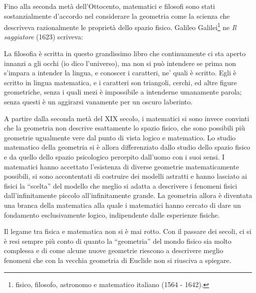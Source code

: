 Fino alla seconda metà dell'Ottocento, matematici e filosofi sono stati sostanzialmente d'accordo nel considerare la geometria come la scienza che descriveva razionalmente le proprietà dello spazio fisico. Galileo Galilei\footnote{fisico, filosofo, astronomo e matematico italiano (1564 - 1642).} ne \emph{Il saggiatore} (1623) scriveva:
\begin{quoting}
La filosofia è scritta in questo grandissimo libro che continuamente ci sta aperto innanzi a gli occhi (io dico l'universo), ma non si può intendere se prima non s'impara a intender la lingua, e conoscer i caratteri, ne' quali è scritto. Egli è scritto in lingua matematica, e i caratteri son triangoli, cerchi, ed altre figure geometriche, senza i quali mezi è impossibile a intenderne umanamente parola; senza questi è un aggirarsi vanamente per un oscuro laberinto.
\end{quoting}
A partire dalla seconda metà del XIX secolo, i matematici si sono invece convinti che la geometria non descrive esattamente lo spazio fisico, che sono possibili più geometrie ugualmente vere dal punto di vista logico e matematico. Lo studio matematico della geometria si è allora differenziato dallo studio dello spazio fisico e da quello dello spazio psicologico percepito dall'uomo con i suoi sensi. I matematici hanno accettato l'esistenza di diverse geometrie matematicamente possibili, si sono accontentati di costruire dei modelli astratti e hanno lasciato ai fisici la ``scelta'' del modello che meglio si adatta a descrivere i fenomeni fisici dall'infinitamente piccolo all'infinitamente grande. La geometria allora è diventata una branca della matematica alla quale i matematici hanno cercato di dare un fondamento esclusivamente logico, indipendente dalle esperienze fisiche. 

Il legame tra fisica e matematica non si è mai rotto. Con il passare dei secoli, ci si è resi sempre più conto di quanto la ``geometria'' del mondo fisico sia molto complessa e di come alcune nuove geometrie riescono a descrivere meglio fenomeni che con la vecchia geometria di Euclide non si riusciva a spiegare.

